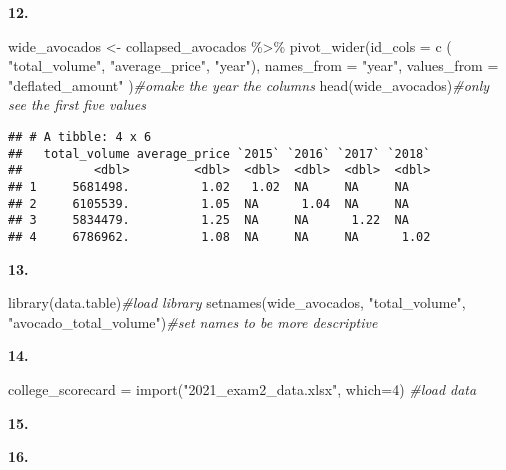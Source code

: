 \documentclass[
]{article}
\newenvironment{Shaded}{\begin{snugshade}}{\end{snugshade}}
\newcommand{\AttributeTok}[1]{\textcolor[rgb]{0.77,0.63,0.00}{#1}}
\newcommand{\CommentTok}[1]{\textcolor[rgb]{0.56,0.35,0.01}{\textit{#1}}}
\newcommand{\DecValTok}[1]{\textcolor[rgb]{0.00,0.00,0.81}{#1}}
\newcommand{\FunctionTok}[1]{\textcolor[rgb]{0.00,0.00,0.00}{#1}}
\newcommand{\NormalTok}[1]{#1}
\newcommand{\OtherTok}[1]{\textcolor[rgb]{0.56,0.35,0.01}{#1}}
\newcommand{\SpecialCharTok}[1]{\textcolor[rgb]{0.00,0.00,0.00}{#1}}
\newcommand{\StringTok}[1]{\textcolor[rgb]{0.31,0.60,0.02}{#1}}
\begin{document}
\textbf{12. }

\begin{Shaded}
\begin{Highlighting}[]
\NormalTok{wide\_avocados }\OtherTok{\textless{}{-}}\NormalTok{ collapsed\_avocados }\SpecialCharTok{\%\textgreater{}\%} \FunctionTok{pivot\_wider}\NormalTok{(}\AttributeTok{id\_cols =} \FunctionTok{c}\NormalTok{ ( }\StringTok{"total\_volume"}\NormalTok{, }\StringTok{"average\_price"}\NormalTok{, }\StringTok{"year"}\NormalTok{), }\AttributeTok{names\_from =} \StringTok{"year"}\NormalTok{, }\AttributeTok{values\_from =} \StringTok{"deflated\_amount"}\NormalTok{ )}\CommentTok{\#omake the year the columns}
\FunctionTok{head}\NormalTok{(wide\_avocados)}\CommentTok{\#only see the first five values}
\end{Highlighting}
\end{Shaded}

\begin{verbatim}
## # A tibble: 4 x 6
##   total_volume average_price `2015` `2016` `2017` `2018`
##          <dbl>         <dbl>  <dbl>  <dbl>  <dbl>  <dbl>
## 1     5681498.          1.02   1.02  NA     NA     NA   
## 2     6105539.          1.05  NA      1.04  NA     NA   
## 3     5834479.          1.25  NA     NA      1.22  NA   
## 4     6786962.          1.08  NA     NA     NA      1.02
\end{verbatim}

\textbf{13. }

\begin{Shaded}
\begin{Highlighting}[]
\FunctionTok{library}\NormalTok{(data.table)}\CommentTok{\#load library}
\FunctionTok{setnames}\NormalTok{(wide\_avocados, }\StringTok{"total\_volume"}\NormalTok{, }\StringTok{"avocado\_total\_volume"}\NormalTok{)}\CommentTok{\#set names to be more descriptive }
\end{Highlighting}
\end{Shaded}

\textbf{14. }

\begin{Shaded}
\begin{Highlighting}[]
\NormalTok{college\_scorecard }\OtherTok{=} \FunctionTok{import}\NormalTok{(}\StringTok{"2021\_exam2\_data.xlsx"}\NormalTok{, }\AttributeTok{which=}\DecValTok{4}\NormalTok{) }\CommentTok{\#load data}
\end{Highlighting}
\end{Shaded}

\textbf{15. }

\textbf{16. }
\end{document}
